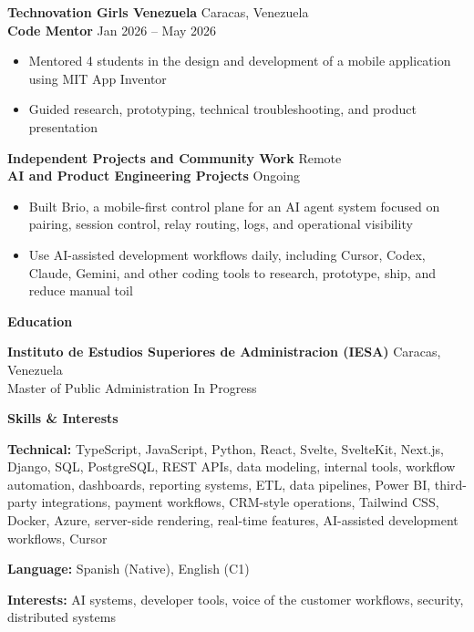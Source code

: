 \documentclass[11pt]{article}
\begin{document}
\vspace{12pt}

\textbf{Technovation Girls Venezuela} \hfill Caracas, Venezuela \\
\textbf{Code Mentor} \hfill Jan 2026 -- May 2026
\begin{itemize}
    \item Mentored 4 students in the design and development of a mobile application using MIT App Inventor
    \item Guided research, prototyping, technical troubleshooting, and product presentation
\end{itemize}

\vspace{12pt}

\textbf{Independent Projects and Community Work} \hfill Remote \\
\textbf{AI and Product Engineering Projects} \hfill Ongoing
\begin{itemize}
    \item Built Brio, a mobile-first control plane for an AI agent system focused on pairing, session control, relay routing, logs, and operational visibility
    \item Use AI-assisted development workflows daily, including Cursor, Codex, Claude, Gemini, and other coding tools to research, prototype, ship, and reduce manual toil
\end{itemize}

\begin{center}
    \textbf{Education}
\end{center}
\textbf{Instituto de Estudios Superiores de Administracion (IESA)} \hfill Caracas, Venezuela \\
Master of Public Administration \hfill In Progress

\vspace{12pt}

\begin{center}
    \textbf{Skills \& Interests}
\end{center}

\textbf{Technical:} TypeScript, JavaScript, Python, React, Svelte, SvelteKit, Next.js, Django, SQL, PostgreSQL, REST APIs, data modeling, internal tools, workflow automation, dashboards, reporting systems, ETL, data pipelines, Power BI, third-party integrations, payment workflows, CRM-style operations, Tailwind CSS, Docker, Azure, server-side rendering, real-time features, AI-assisted development workflows, Cursor

\textbf{Language:} Spanish (Native), English (C1)

\textbf{Interests:} AI systems, developer tools, voice of the customer workflows, security, distributed systems
\end{document}

